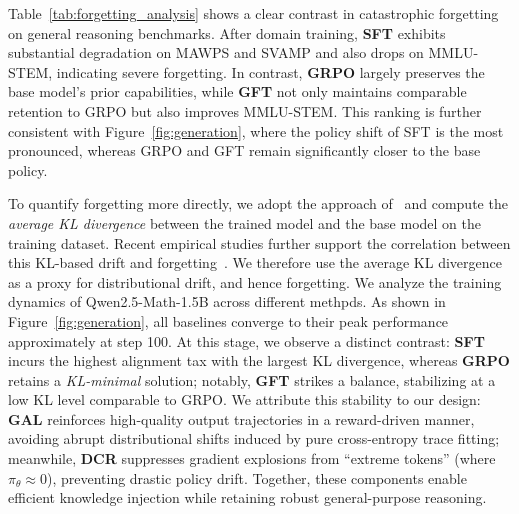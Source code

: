 Table~\ref{tab:forgetting_analysis} shows a clear contrast in catastrophic forgetting on general reasoning benchmarks.
After domain training, \textbf{SFT} exhibits substantial degradation on \textsc{MAWPS} and \textsc{SVAMP} and also drops on \textsc{MMLU-STEM}, indicating severe forgetting.
In contrast, \textbf{GRPO} largely preserves the base model's prior capabilities, while \textbf{GFT} not only maintains comparable retention to GRPO but also improves \textsc{MMLU-STEM}.
This ranking is further consistent with Figure~\ref{fig:generation}, where the policy shift of SFT is the most pronounced, whereas GRPO and GFT remain significantly closer to the base policy.



To quantify forgetting more directly, we adopt the approach of~\cite{shenfeld2025rl} and compute the \emph{average KL divergence} between the trained model and the base model on the training dataset. Recent empirical studies further support the correlation between this KL-based drift and forgetting~\citep{chu2025sft, luo2025empirical, ruan2025unveiling}. We therefore use the average KL divergence as a proxy for distributional drift, and hence forgetting.
We analyze the training dynamics of Qwen2.5-Math-1.5B across different methpds.
As shown in Figure~\ref{fig:generation}, all baselines converge to their peak performance approximately at step 100.
At this stage, we observe a distinct contrast: \textbf{SFT} incurs the highest alignment tax with the largest KL divergence, whereas \textbf{GRPO} retains a \emph{KL-minimal} solution; notably, \textbf{GFT} strikes a balance, stabilizing at a low KL level comparable to GRPO.
We attribute this stability to our design: \textbf{GAL} reinforces high-quality output trajectories in a reward-driven manner, avoiding abrupt distributional shifts induced by pure cross-entropy trace fitting; meanwhile, \textbf{DCR} suppresses gradient explosions from ``extreme tokens'' (where $\pi_{\theta}\!\approx\!0$), preventing drastic policy drift.
Together, these components enable efficient knowledge injection while retaining robust general-purpose reasoning.



